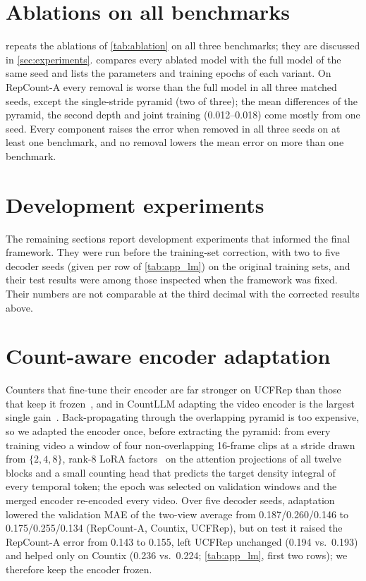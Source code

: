 

\section{Ablations on all benchmarks}
\label{app:ablation}
 repeats the ablations of \cref{tab:ablation} on all three
benchmarks; they are discussed in \cref{sec:experiments}. 
compares every ablated model with the full model of the same seed and lists the
parameters and training epochs of each variant. On RepCount-A every removal is
worse than the full model in all three matched seeds, except the single-stride
pyramid (two of three); the mean differences of the pyramid, the second depth
and joint training (0.012--0.018) come mostly from one seed. Every component
raises the error when removed in all three seeds on at least one benchmark,
and no removal lowers the mean error on more than one benchmark.




\section*{Development experiments}
The remaining sections report development experiments that informed the final
framework. They were run before the training-set correction, with two to five
decoder seeds (given per row of \cref{tab:app_lm}) on the original training sets,
and their test results were among those
inspected when the framework was fixed. Their numbers are not comparable at the
third decimal with the corrected results above.

\section{Count-aware encoder adaptation}
\label{app:adapt}
Counters that fine-tune their encoder are far stronger on UCFRep than those that
keep it frozen~\cite{zhang2020context,sinha2024escounts}, and in CountLLM adapting
the video encoder is the largest single gain~\cite{yao2025countllm}.
Back-propagating through the overlapping pyramid is too expensive, so we adapted
the encoder once, before extracting the pyramid: from every training video a
window of four non-overlapping 16-frame clips at a stride drawn from $\{2,4,8\}$,
rank-8 LoRA factors~\cite{hu2022lora} on the attention projections of all twelve
blocks and a small counting head that predicts the target density integral of
every temporal token; the epoch was selected on validation windows and the merged
encoder re-encoded every video. Over five decoder seeds, adaptation lowered the
validation MAE of the two-view average from 0.187/0.260/0.146 to 0.175/0.255/0.134
(RepCount-A, Countix, UCFRep), but on test it raised the RepCount-A error from
0.143 to 0.155, left UCFRep unchanged (0.194 vs.\ 0.193) and helped only on
Countix (0.236 vs.\ 0.224; \cref{tab:app_lm}, first two rows); we therefore keep
the encoder frozen.

